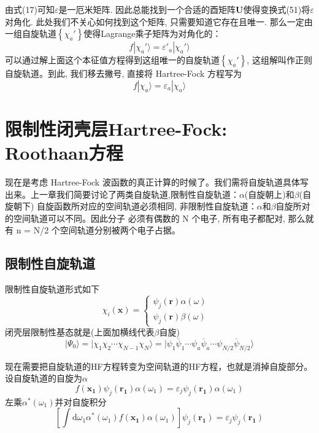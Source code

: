 \documentclass[]{article}
\begin{document}
由式(17)可知$\varepsilon$是一厄米矩阵. 因此总能找到一个合适的酉矩阵$\mathbf{U}$使得变换式(51)将$\varepsilon$对角化. 此处我们不关心如何找到这个矩阵, 只需要知道它存在且唯一. 那么一定由一组自旋轨道$\left\lbrace \chi_a'\right\rbrace $使得Lagrange乘子矩阵为对角化的：
\begin{equation}
	f|\chi_a'\rangle=\varepsilon'_a|\chi_a'\rangle
\end{equation}
可以通过解上面这个本征值方程得到这组唯一的自旋轨道$\left\lbrace \chi_a'\right\rbrace $, 这组解叫作正则自旋轨道。到此, 我们移去撇号, 直接将 Hartree-Fock 方程写为
\begin{equation}
	f|\chi_a\rangle=\varepsilon_a|\chi_a\rangle
\end{equation}
\section{限制性闭壳层Hartree-Fock: Roothaan方程}
现在是考虑 Hartree-Fock 波函数的真正计算的时候了。我们需将自旋轨道具体写出来。上一章我们简要讨论了两类自旋轨道,限制性自旋轨道：$\alpha$(自旋朝上)和$\beta$(自旋朝下) 自旋函数所对应的空间轨道必须相同, 非限制性自旋轨道：$\alpha$和$\beta$自旋所对的空间轨道可以不同。因此分子
必须有偶数的 N 个电子, 所有电子都配对, 那么就有 n = N/2 个空间轨道分别被两个电子占据。
\subsection{限制性自旋轨道}
限制性自旋轨道形式如下
\begin{equation}
	\chi_i(\mathbf{x})=
	\begin{cases}
		\psi_j(\mathbf{r})\alpha(\omega)&\\
		\psi_j(\mathbf{r})\beta(\omega)&
	\end{cases}
\end{equation}
闭壳层限制性基态就是(上面加横线代表$\beta$自旋)
\begin{equation}
	|\Psi_0\rangle=|\chi_1\chi_2\cdots\chi_{N-1}\chi_N\rangle=|\psi_1\overline{\psi}_1\cdots\psi_a\overline{\psi}_a\cdots\psi_{N/2}\overline{\psi}_{N/2}\rangle
\end{equation}

现在需要把自旋轨道的HF方程转变为空间轨道的HF方程，也就是消掉自旋部分。设自旋轨道的自旋为$\alpha$
\begin{equation}
	f(\mathbf{x_1})\psi_j(\mathbf{r_1})\alpha(\omega_1)=\varepsilon_j\psi_j(\mathbf{r_1})\alpha(\omega_1)
\end{equation}
左乘$\alpha^*(\omega_1)$并对自旋积分
\begin{equation}
	\left[ \int\mathrm{d}\omega_1\alpha^*(\omega_1)f(\mathbf{x_1})\alpha(\omega_1)\right]\psi_j(\mathbf{r_1})= \varepsilon_j\psi_j(\mathbf{r_1})
\end{equation}
\end{document}
